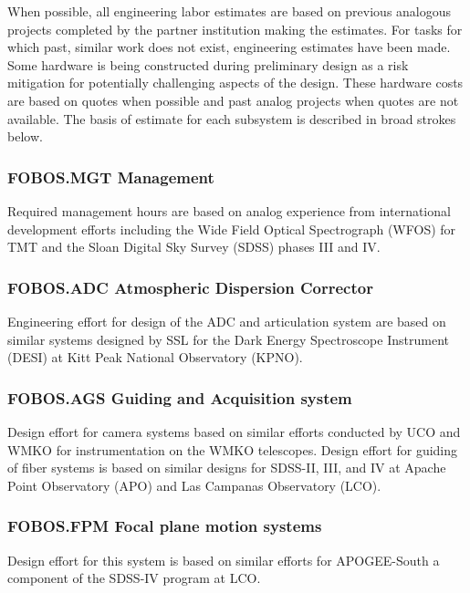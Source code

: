 \documentclass[oneside,11pt]{amsart}
\begin{document}
When possible, all engineering labor estimates are based on previous
analogous projects completed by the partner institution making the
estimates. For tasks for which past, similar work does not exist,
engineering estimates have been made. Some hardware is being
constructed during preliminary design as a risk mitigation for
potentially challenging aspects of the design. These hardware costs
are based on quotes when possible and past analog projects when
quotes are not available. The basis of estimate for each subsystem
is described in broad strokes below.

\subsubsection{FOBOS.MGT Management}

Required management hours are based on analog experience from
international development efforts including the Wide Field Optical
Spectrograph (WFOS) for TMT and the Sloan Digital Sky Survey (SDSS)
phases III and IV.

\subsubsection{FOBOS.ADC Atmospheric Dispersion Corrector}

Engineering effort for design of the ADC and articulation system are
based on similar systems designed by SSL for the Dark Energy
Spectroscope Instrument (DESI) at Kitt Peak National Observatory
(KPNO).

\subsubsection{FOBOS.AGS Guiding and Acquisition system}

Design effort for camera systems based on similar efforts conducted
by UCO and WMKO for instrumentation on the WMKO telescopes. Design
effort for guiding of fiber systems is based on similar designs for
SDSS-II, III, and IV at Apache Point Observatory (APO) and Las
Campanas Observatory (LCO).

\subsubsection{FOBOS.FPM Focal plane motion systems}

Design effort for this system is based on similar efforts for
APOGEE-South a component of the SDSS-IV program at LCO.
\end{document}
